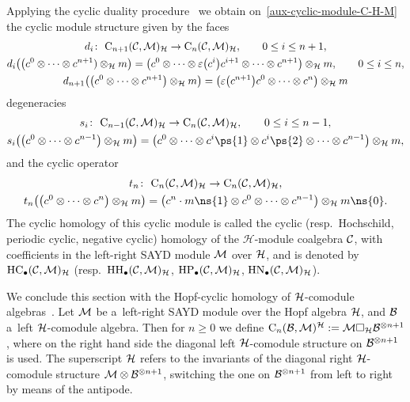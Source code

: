 Applying the cyclic duality procedure~\cite{Conn83,KhalRang05} we obtain on~\eqref{aux-cyclic-module-C-H-M} the cyclic
module structure given by the faces
\begin{gather*}%
d_i\colon \ {\rm C}_{n+1}({\cal C},{\cal M})_{{\cal H}} \to {\rm C}_n({\cal C},{\cal M})_{{\cal H}},
\qquad
0 \leq i \leq n+1,
\\
d_i\big(\big(c^0 \otimes \cdots \otimes c^{n+1}) \otimes_{{\cal H}} m\big) =\big(c^0 \otimes \cdots \otimes \varepsilon\big(c^i\big)c^{i+1}
\otimes \cdots \otimes c^{n+1}\big) \otimes_{{\cal H}} m,
\qquad
0 \leq i \leq n,
\\
d_{n+1}\big(\big(c^0 \otimes \cdots \otimes c^{n+1}\big) \otimes_{{\cal H}} m\big) =\big(\varepsilon\big(c^{n+1}\big) c^0 \otimes \cdots \otimes
c^{n}\big) \otimes_{{\cal H}} m
\end{gather*}
degeneracies
\begin{gather*}%
s_i\colon \ {\rm C}_{n-1}({\cal C},{\cal M})_{{\cal H}} \to {\rm C}_n({\cal C},{\cal M})_{{\cal H}},
\qquad
0 \leq i \leq n-1,
\\
s_i\big(\big(c^0 \otimes \cdots \otimes c^{n-1}\big) \otimes_{\mathcal{H}} m\big) =\big(c^0 \otimes \cdots \otimes c^i\ps{1} \otimes
c^i\ps{2} \otimes \cdots \otimes c^{n-1}\big) \otimes_{\mathcal{H}} m,
\end{gather*}
and the cyclic operator
\begin{gather*}%
t_n\colon \ {\rm C}_{n}({\cal C},{\cal M})_{{\cal H}} \to {\rm C}_n({\cal C},{\cal M})_{{\cal H}},
\\
t_n\big(\big(c^0 \otimes \cdots \otimes c^n\big) \otimes_{{\cal H}} m\big) =\big(c^n \cdot m\ns{1} \otimes c^0 \otimes \cdots \otimes
c^{n-1}\big) \otimes_{{\cal H}} m\ns{0}.
\end{gather*}
The cyclic homology of this cyclic module is called the cyclic (resp.\
Hochschild, periodic cyclic, negative cyclic) homology of the $\mathcal{H}$-module coalgebra ${\cal C}$, with
coef\/f\/icients in the left-right SAYD module ${\cal M}$ over ${\cal H}$, and is denoted by ${\rm HC}_\bullet({\cal
C},{\cal M})_{\cal H}$ (resp.\
${\rm HH}_\bullet({\cal C},{\cal M})_{\cal H}$, ${\rm HP}_\bullet({\cal C},{\cal M})_{\cal H}$, ${\rm HN}_\bullet({\cal
C},{\cal M})_{\cal H}$).

We conclude this section with the Hopf-cyclic homology of ${\cal H}$-comodule algebras~\cite{HajaKhalRangSomm04-II}.
Let ${\cal M}$ be a~left-right SAYD module over the Hopf algebra ${\cal H}$, and ${\cal B}$ a~left ${\cal H}$-comodule algebra.
Then for $n\geq 0$ we def\/ine ${\rm C}_{n}({\cal B},{\cal M})^{{\cal H}}:={\cal M} \Box_{\cal H} {\cal B}^{\otimes n+1}$,
where on the right hand side the diagonal left ${\cal H}$-comodule structure on ${\cal B}^{\otimes n+1}$ is used.
The superscript ${\cal H}$ refers to the invariants of the diagonal right ${\cal H}$-comodule structure ${\cal
M}\otimes{\cal B}^{\otimes n+1}$, switching the one on ${\cal B}^{\otimes n+1}$ from left to right by means of the
antipode.

